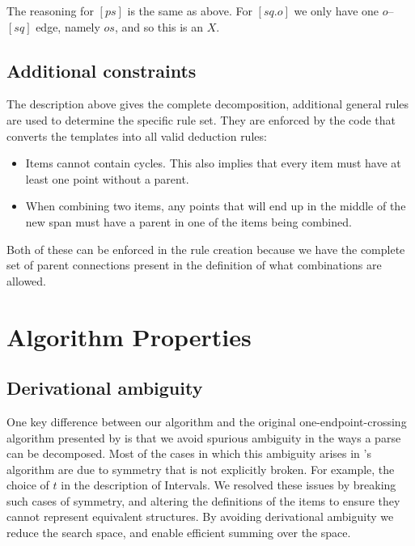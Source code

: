 The reasoning for $[ps]$ is the same as above.
For $[sq.o]$ we only have one $o$--$[sq]$ edge, namely $os$, and so this is an $X$.


\subsection{Additional constraints}
The description above gives the complete decomposition, additional general rules are used to determine the specific rule set.
They are enforced by the code that converts the templates into all valid deduction rules:

\begin{itemize}
  \item Items cannot contain cycles.
  This also implies that every item must have at least one point without a parent.
  \item When combining two items, any points that will end up in the middle of the new span must have a parent in one of the items being combined.
\end{itemize}

Both of these can be enforced in the rule creation because we have the complete set of parent connections present in the definition of what combinations are allowed.

\section{Algorithm Properties} \label{sec:algorithm-properties}

\subsection{Derivational ambiguity}

One key difference between our algorithm and the original one-endpoint-crossing algorithm presented by \textcite{ec} is that we avoid spurious ambiguity in the ways a parse can be decomposed.
Most of the cases in which this ambiguity arises in \textcite{ec}'s algorithm are due to symmetry that is not explicitly broken.
For example, the choice of $t$ in the description of Intervals.
We resolved these issues by breaking such cases of symmetry, and altering the definitions of the items to ensure they cannot represent equivalent structures.
By avoiding derivational ambiguity we reduce the search space, and enable efficient summing over the space.

